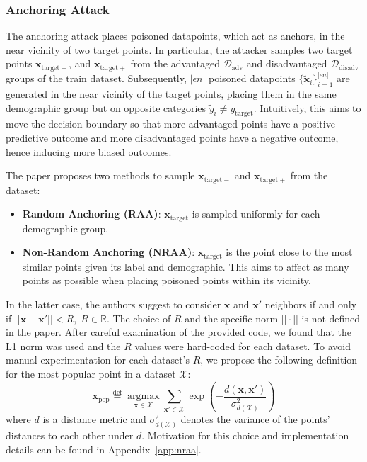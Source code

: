 \subsubsection{Anchoring Attack}
The anchoring attack places poisoned datapoints, which act as anchors, in the near vicinity of two target points. In particular, the attacker samples two target points $\mathbf{x}_{\mathrm{target-}}$, and $\mathbf{x}_{\mathrm{target+}}$ from the advantaged $\mathcal{D}_{\mathrm{adv}}$ and disadvantaged $\mathcal{D}_{\mathrm{disadv}}$ groups of the train dataset. Subsequently, $|\epsilon n|$ poisoned datapoints $\{\tilde{\mathbf{x}}_i \}_{i=1}^{|\epsilon n|}$ are generated in the near vicinity of the target points, placing them in the same demographic group but on opposite categories $\tilde{y}_i \neq y_{\mathrm{target}}$. Intuitively, this aims to move the decision boundary so that more advantaged points have a positive predictive outcome and more disadvantaged points have a negative outcome, hence inducing more biased outcomes.

The paper proposes two methods to sample $\mathbf{x}_{\mathrm{target-}}$ and $\mathbf{x}_{\mathrm{target+}}$ from the dataset:
\begin{itemize}
    \item \textbf{Random Anchoring (RAA)}: $\mathbf{x}_{\mathrm{target}}$ is sampled uniformly for each demographic group.
    \item \textbf{Non-Random Anchoring (NRAA)}: $\mathbf{x}_{\mathrm{target}}$ is the point close to the most similar points given its label and demographic. This aims to affect as many points as possible when placing poisoned points within its vicinity.
\end{itemize}

In the latter case, the authors suggest to consider $\mathbf{x}$ and $\mathbf{x}'$ neighbors if and only if $||\mathbf{x}-\mathbf{x}'|| < R,\; R\in\mathbb{R}$. The choice of $R$ and the specific norm $||\cdot||$ is not defined in the paper. After careful examination of the provided code, we found that the L1 norm was used and the $R$ values were hard-coded for each dataset. To avoid manual experimentation for each dataset's $R$, we propose the following definition for the most popular point in a dataset $\mathcal{X}$:
\begin{equation}
    \mathbf{x}_{\mathrm{pop}} \stackrel{\mathrm{def}}{=} \underset{\mathbf{x}\in\mathcal{X}}{\operatorname{argmax}} \displaystyle\sum_{\mathbf{x}'\in\mathcal{X}} \exp\left(-\frac{d(\mathbf{x}, \mathbf{x}')}{\sigma^2_{d(\mathcal{X})}}\right)
\end{equation}
where $d$ is a distance metric and $\sigma^2_{d(\mathcal{X})}$ denotes the variance of the points' distances to each other under $d$. Motivation for this choice and implementation details can be found in Appendix~\ref{app:nraa}.

